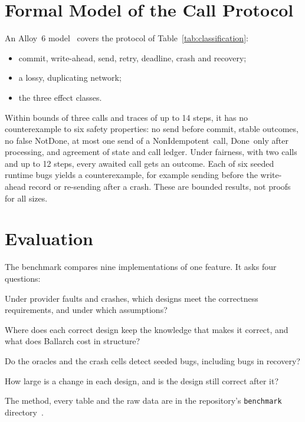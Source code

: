 \documentclass[11pt]{article}
\theoremstyle{definition}
\theoremstyle{plain}
\newcommand{\Done}{\textsf{Done}}
\newcommand{\NotDone}{\textsf{NotDone}}
\newcommand{\NonIdem}{\textsf{NonIdempotent}}
\begin{document}
\section{Formal Model of the Call Protocol}

An Alloy~6 model~\citep{Jackson2012Alloy} covers the protocol of Table~\ref{tab:classification}:
\begin{itemize}[nosep]
  \item commit, write-ahead, send, retry, deadline, crash and recovery;
  \item a lossy, duplicating network;
  \item the three effect classes.
\end{itemize}
Within bounds of three calls and traces of up to 14 steps, it has no counterexample to six safety properties: no send before commit, stable outcomes, no false \NotDone, at most one send of a \NonIdem\ call, \Done\ only after processing, and agreement of state and call ledger. Under fairness, with two calls and up to 12 steps, every awaited call gets an outcome. Each of six seeded runtime bugs yields a counterexample, for example sending before the write-ahead record or re-sending after a crash. These are bounded results, not proofs for all sizes.

\section{Evaluation}
\label{sec:evaluation}

The benchmark compares nine implementations of one feature. It asks four questions:
\begin{description}[leftmargin=1em,nosep]
  \item[RQ1.] Under provider faults and crashes, which designs meet the correctness requirements, and under which assumptions?
  \item[RQ2.] Where does each correct design keep the knowledge that makes it correct, and what does Ballarch cost in structure?
  \item[RQ3.] Do the oracles and the crash cells detect seeded bugs, including bugs in recovery?
  \item[RQ4.] How large is a change in each design, and is the design still correct after it?
\end{description}
The method, every table and the raw data are in the repository's \texttt{benchmark} directory~\citep{BallarchRepo}.
\end{document}

